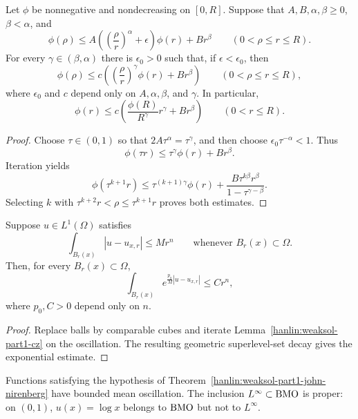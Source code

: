 \begin{lemma}\label{hanlin:weaksol-part1-lemma-3-4}
Let $\phi$ be nonnegative and nondecreasing on $[0,R]$. Suppose that
$A,B,\alpha,\beta\geq0$, $\beta<\alpha$, and
\[
\phi(\rho)\leq A\left(\left(\frac{\rho}{r}\right)^\alpha
+\epsilon\right)\phi(r)+Br^\beta
\qquad(0<\rho\leq r\leq R).
\]
For every $\gamma\in(\beta,\alpha)$ there is $\epsilon_0>0$ such that,
if $\epsilon<\epsilon_0$, then
\[
\phi(\rho)\leq c\left(
\left(\frac{\rho}{r}\right)^\gamma\phi(r)+Br^\beta\right)
\qquad(0<\rho\leq r\leq R),
\]
where $\epsilon_0$ and $c$ depend only on $A,\alpha,\beta$, and $\gamma$.
In particular,
\[
\phi(r)\leq c\left(\frac{\phi(R)}{R^\gamma}r^\gamma+Br^\beta\right)
\qquad(0<r\leq R).
\]
\end{lemma}
\begin{proof}
\sketch Choose $\tau\in(0,1)$ so that
$2A\tau^\alpha=\tau^\gamma$, and then choose
$\epsilon_0\tau^{-\alpha}<1$. Thus
\[
\phi(\tau r)\leq\tau^\gamma\phi(r)+Br^\beta.
\]
Iteration yields
\[
\phi(\tau^{k+1}r)
\leq\tau^{(k+1)\gamma}\phi(r)
+\frac{B\tau^{k\beta}r^\beta}{1-\tau^{\gamma-\beta}}.
\]
Selecting $k$ with $\tau^{k+2}r<\rho\leq\tau^{k+1}r$ proves both
estimates.
\end{proof}

\begin{theorem}\label{hanlin:weaksol-part1-john-nirenberg}
Suppose $u\in L^1(\Omega)$ satisfies
\[
\int_{B_r(x)}|u-u_{x,r}|\leq Mr^n
\qquad\text{whenever }B_r(x)\subset\Omega.
\]
Then, for every $B_r(x)\subset\Omega$,
\[
\int_{B_r(x)}e^{\frac{p_0}{M}|u-u_{x,r}|}\leq Cr^n,
\]
where $p_0,C>0$ depend only on $n$.
\end{theorem}

\begin{proof}
\sketch Replace balls by comparable cubes and iterate
Lemma~\ref{hanlin:weaksol-part1-cz} on the oscillation. The resulting
geometric superlevel-set decay gives the exponential estimate.
\end{proof}

\begin{remark}\label{hanlin:weaksol-part1-bmo}
Functions satisfying the hypothesis of
Theorem~\ref{hanlin:weaksol-part1-john-nirenberg} have bounded mean
oscillation. The inclusion $L^\infty\subset\mathrm{BMO}$ is proper: on $(0,1)$,
$u(x)=\log x$ belongs to $\mathrm{BMO}$ but not to $L^\infty$.
\end{remark}

